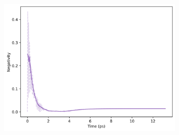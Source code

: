 \documentclass[11pt]{article}
\begin{document}
\begin{figure}[H]
    \vspace{0.5cm}
    
    \begin{subfigure}{0.45\textwidth}
        \centering
        \includegraphics[width=\linewidth]{Research Project/Code/results/ExVib/Open/Negativity/neg_both_e0.png}
        \caption{}
        \label{fig:EVM_OQS_Neg_both}
    \end{subfigure}
    \hfill

    \caption{}
    \label{fig:EVM_OQS_Neg}
\end{figure}


\end{document}
